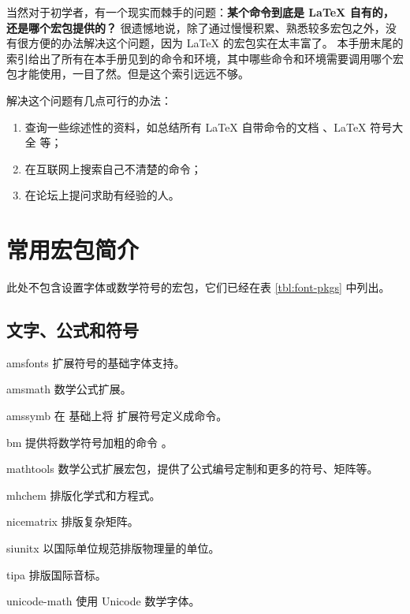 当然对于初学者，有一个现实而棘手的问题：\textbf{某个命令到底是 \LaTeX{} 自有的，还是哪个宏包提供的？}
很遗憾地说，除了通过慢慢积累、熟悉较多宏包之外，没有很方便的办法解决这个问题，因为 \LaTeX{} 的宏包实在太丰富了。
本手册末尾的索引给出了所有在本手册见到的命令和环境，其中哪些命令和环境需要调用哪个宏包才能使用，一目了然。但是这个索引远远不够。

解决这个问题有几点可行的办法：
\begin{enumerate}
  \item 查询一些综述性的资料，如总结所有 \LaTeX{} 自带命令的文档 \cite{latex2e}、\LaTeX{} 符号大全 \cite{symbols} 等；
  \item 在互联网上搜索自己不清楚的命令；
  \item 在论坛上提问求助有经验的人。
\end{enumerate}

\section{常用宏包简介}\label{sec:pkg-list}

\def\pkglabel#1{\makebox[60pt][l]{\pkg{#1}}}
\newenvironment{pkglist}%
  {\list{}{%
    \labelwidth=60pt
    \itemindent=0pt
    \leftmargin=60pt
    \labelsep=0pt
    \let\makelabel\pkglabel}}%
  {\endlist}

此处不包含设置字体或数学符号的宏包，它们已经在表 \ref{tbl:font-pkgs} 中列出。

\subsection{文字、公式和符号}\label{subsec:text-math-symbols}

\begin{pkglist}
  \item[amsfonts]      扩展符号的基础字体支持。
  \item[amsmath]       数学公式扩展。
  \item[amssymb]      在  基础上将  扩展符号定义成命令。
  \item[bm]           提供将数学符号加粗的命令 。
  \item[mathtools]    数学公式扩展宏包，提供了公式编号定制和更多的符号、矩阵等。
  \item[mhchem]       排版化学式和方程式。
  \item[nicematrix]   排版复杂矩阵。
  \item[siunitx]      以国际单位规范排版物理量的单位。
  \item[tipa]         排版国际音标。
  \item[unicode-math] 使用 Unicode 数学字体。
\end{pkglist}

